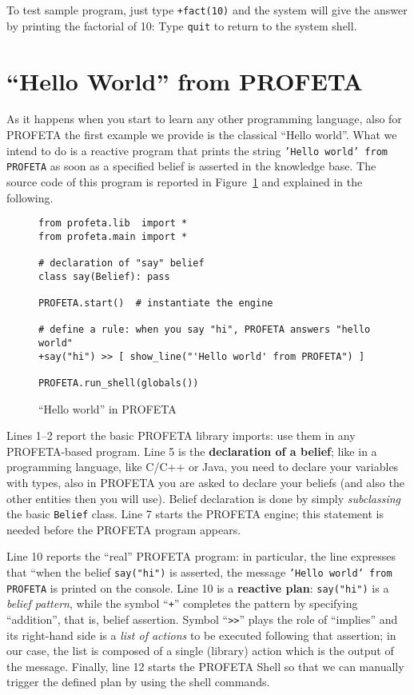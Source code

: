 To test sample program, just type \texttt{+fact(10)} and the system will
give the answer by
printing the factorial of 10:
Type \texttt{quit} to return to the system shell.


\section{``Hello World'' from PROFETA}
As it happens when you start to learn any other programming language, also
for PROFETA the first example we provide is the classical ``Hello world''.
What we intend to do is a reactive program that prints the string
\texttt{'Hello world' from PROFETA} as soon as a specified belief is
asserted in the knowledge base.
The source code of this program is reported in
Figure~\ref{fig:hello} and explained in the following.

\begin{figure}[b!]
\python%
\begin{lstlisting}
from profeta.lib  import *
from profeta.main import *

# declaration of "say" belief
class say(Belief): pass

PROFETA.start()  # instantiate the engine

# define a rule: when you say "hi", PROFETA answers "hello world"
+say("hi") >> [ show_line("'Hello world' from PROFETA") ]

PROFETA.run_shell(globals())
\end{lstlisting}
\caption{``Hello world'' in PROFETA}\label{fig:hello}
\end{figure}


Lines 1--2 report the basic PROFETA library imports: use them in any
PROFETA-based program.
Line 5 is the \textbf{declaration of a belief}; like in a programming
language, like C/C++ or Java, you need to declare your variables with types, also in
PROFETA you are asked to declare your beliefs (and also the other entities
then you will use).
Belief declaration is done by simply \emph{subclassing} the basic
\texttt{Belief} class.
Line 7 starts the PROFETA engine; this statement is needed before
the PROFETA program appears.

Line 10 reports the ``real'' PROFETA program: in particular, the line
expresses that ``when the belief \texttt{say("hi")} is asserted, the
message \texttt{'Hello world' from PROFETA} is printed on the console.
Line 10 is a \textbf{reactive plan}: \texttt{say("hi")} is a \emph{belief
  pattern}, while the symbol ``\texttt{+}'' completes the pattern by
specifying ``addition'', that is, belief assertion.
Symbol ``\verb+>>+'' plays the role of ``implies'' and its right-hand side
is a \emph{list of actions} to be executed following that assertion; in our
case, the list is composed of a single (library) action which is the output
of the message.
Finally, line 12 starts the PROFETA Shell so that we can manually trigger
the defined plan by using the shell commands.

